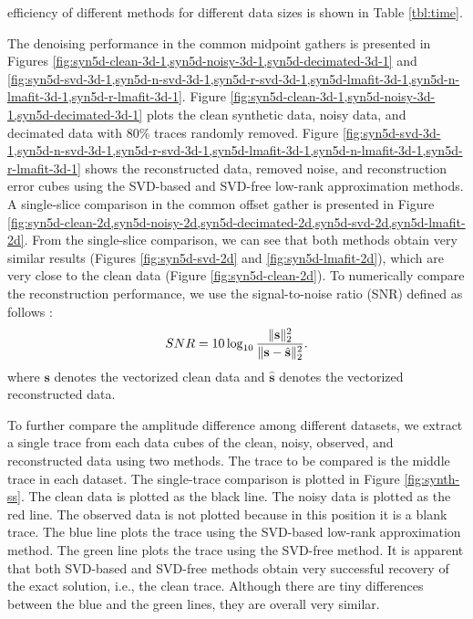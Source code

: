 efficiency of different methods for different data sizes is shown in Table \ref{tbl:time}.

The denoising performance in the common midpoint gathers is presented in Figures \ref{fig:syn5d-clean-3d-1,syn5d-noisy-3d-1,syn5d-decimated-3d-1} and \ref{fig:syn5d-svd-3d-1,syn5d-n-svd-3d-1,syn5d-r-svd-3d-1,syn5d-lmafit-3d-1,syn5d-n-lmafit-3d-1,syn5d-r-lmafit-3d-1}. Figure \ref{fig:syn5d-clean-3d-1,syn5d-noisy-3d-1,syn5d-decimated-3d-1} plots the clean synthetic data, noisy data, and decimated data with 80\% traces randomly removed. Figure \ref{fig:syn5d-svd-3d-1,syn5d-n-svd-3d-1,syn5d-r-svd-3d-1,syn5d-lmafit-3d-1,syn5d-n-lmafit-3d-1,syn5d-r-lmafit-3d-1} shows the reconstructed data, removed noise, and reconstruction error cubes using the SVD-based and SVD-free low-rank approximation methods. A single-slice comparison in the common offset gather is presented in Figure \ref{fig:syn5d-clean-2d,syn5d-noisy-2d,syn5d-decimated-2d,syn5d-svd-2d,syn5d-lmafit-2d}. From the single-slice comparison, we can see that both methods obtain very similar results (Figures \ref{fig:syn5d-svd-2d} and \ref{fig:syn5d-lmafit-2d}), which are very close to the clean data (Figure \ref{fig:syn5d-clean-2d}). To numerically compare the reconstruction performance, we use the signal-to-noise ratio (SNR) defined as follows \cite{weilin2016,weilin2017gji}:
\begin{equation}
\label{eq:dsnr}
SNR=10\log_{10}\frac{\Arrowvert \mathbf{s} \Arrowvert_2^2}{\Arrowvert \mathbf{s} -\hat{\mathbf{s}}\Arrowvert_2^2}.
\end{equation}
where $\mathbf{s}$ denotes the vectorized clean data and $\hat{\mathbf{s}}$ denotes the vectorized reconstructed data. 

To further compare the amplitude difference among different datasets, we extract a single trace from each data cubes of the clean, noisy, observed, and reconstructed data using two methods. The trace to be compared is the middle trace in each dataset. The single-trace comparison is plotted in Figure \ref{fig:synth-ss}. The clean data is plotted as the black line. The noisy data is plotted as the red line. The observed data is not plotted because in this position it is a blank trace. The blue line plots the trace using the SVD-based low-rank approximation method. The green line plots the trace using the SVD-free method. It is apparent that both SVD-based and SVD-free methods obtain very successful recovery of the exact solution, i.e., the clean trace. Although there are tiny differences between the blue and the green lines, they are overall very similar. 


